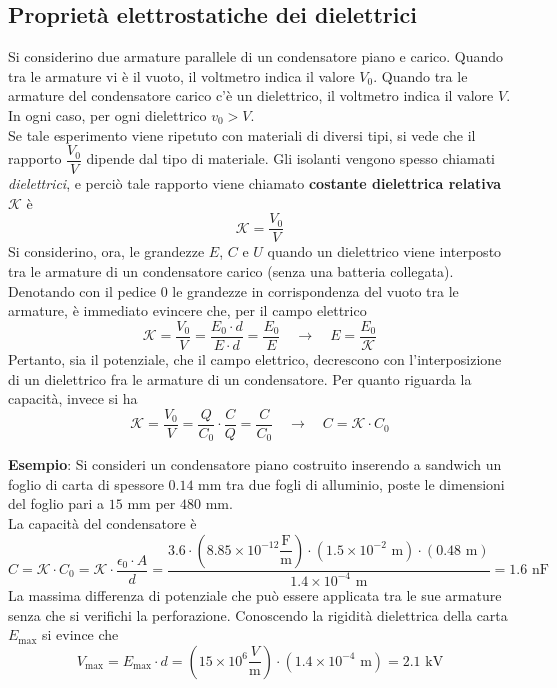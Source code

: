 \documentclass[a4paper]{extarticle}
\begin{document}
\subsection{Proprietà elettrostatiche dei dielettrici}
Si considerino due armature parallele di un condensatore piano e carico. Quando tra le armature vi è il vuoto, il voltmetro indica il valore $V_0$. Quando tra le armature del condensatore carico c'è un dielettrico, il voltmetro indica il valore $V$. In ogni caso, per ogni dielettrico $v_0 > V$.\\
Se tale esperimento viene ripetuto con materiali di diversi tipi, si vede che il rapporto $\dfrac{V_0}{V}$ dipende dal tipo di materiale. Gli isolanti vengono spesso chiamati \textit{dielettrici}, e perciò tale rapporto viene chiamato \textbf{costante dielettrica relativa} $\mathcal{K}$ è
\[\boxed{\mathcal{K} = \frac{V_0}{V}}\]
Si considerino, ora, le grandezze $E$, $C$ e $U$ quando un dielettrico viene interposto tra le armature di un condensatore carico (senza una batteria collegata). Denotando con il pedice $0$ le grandezze in corrispondenza del vuoto tra le armature, è immediato evincere che, per il campo elettrico
\[\mathcal{K}=\frac{V_0}{V}=\frac{E_0 \cdot d}{E \cdot d}=\frac{E_0}{E} \hspace{1em} \rightarrow \hspace{1em} E=\frac{E_0}{\mathcal{K}}\]
Pertanto, sia il potenziale, che il campo elettrico, decrescono con l'interposizione di un dielettrico fra le armature di un condensatore. Per quanto riguarda la capacità, invece si ha
\[\mathcal{K}=\frac{V_0}{V}=\frac{Q}{C_0} \cdot \frac{C}{Q} = \frac{C}{C_0} \hspace{1em} \rightarrow \hspace{1em} C={\mathcal{K}}\cdot C_0\]

\vspace{2em}
\noindent
\textbf{Esempio}: Si consideri un condensatore piano costruito inserendo a sandwich un foglio di carta di spessore $0.14$ mm tra due fogli di alluminio, poste le dimensioni del foglio pari a $15$ mm per $480$ mm.\\
La capacità del condensatore è
\[C = \mathcal{K} \cdot C_0 = \mathcal{K} \cdot \frac{\epsilon_0 \cdot A}{d} = \dfrac{3.6 \cdot \left(8.85 \times 10^{-12} \dfrac{\text{F}}{\text{m}}\right) \cdot \left(1.5 \times 10^{-2} \text{ m}\right) \cdot (0.48 \text{ m})}{1.4 \times 10^{-4} \text{ m}} = 1.6 \text{ nF}\]
La massima differenza di potenziale che può essere applicata tra le sue armature senza che si verifichi la perforazione. Conoscendo la rigidità dielettrica della carta $E_{\max}$ si evince che
\[V_{\max} = E_{\max} \cdot d = \left(15 \times 10^{6} \frac{V}{\text{m}}\right) \cdot (1.4 \times  10^{-4} \text{ m}) = 2.1 \text{ kV}\]
\end{document}
